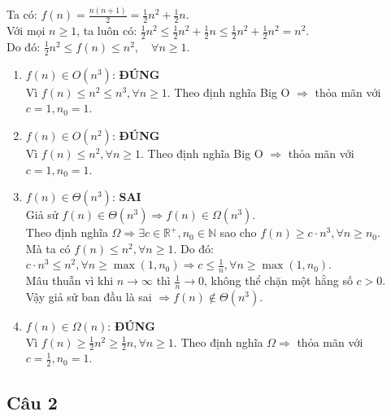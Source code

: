 \documentclass[12pt,a4paper]{article}
\begin{document}
Ta có: $f(n) = \frac{n(n+1)}{2} = \frac{1}{2}n^2 + \frac{1}{2}n$. \\
Với mọi $n \ge 1$, ta luôn có: $\frac{1}{2}n^2 \le \frac{1}{2}n^2 + \frac{1}{2}n \le \frac{1}{2}n^2 + \frac{1}{2}n^2 = n^2$. \\
Do đó: $\frac{1}{2}n^2 \le f(n) \le n^2, \quad \forall n \ge 1$.
\begin{enumerate}
    \item[a.] $f(n) \in O(n^3)$: \textbf{ĐÚNG} \\
    Vì $f(n) \le n^2 \le n^3, \forall n \ge 1$. Theo định nghĩa Big O $\Rightarrow$ thỏa mãn với $c = 1, n_0 = 1$.
    
    \item[b.] $f(n) \in O(n^2)$: \textbf{ĐÚNG} \\
    Vì $f(n) \le n^2, \forall n \ge 1$. Theo định nghĩa Big O $\Rightarrow$ thỏa mãn với $c = 1, n_0 = 1$.
    
    \item[c.] $f(n) \in \Theta(n^3)$: \textbf{SAI} \\
    Giả sử $f(n) \in \Theta(n^3) \Rightarrow f(n) \in \Omega(n^3)$. \\
    Theo định nghĩa $\Omega \Rightarrow \exists c \in \mathbb{R}^+, n_0 \in \mathbb{N}$ sao cho $f(n) \ge c \cdot n^3, \forall n \ge n_0$. \\
    Mà ta có $f(n) \le n^2, \forall n \ge 1$. Do đó: \\
    $c \cdot n^3 \le n^2, \forall n \ge \max(1, n_0) \Rightarrow c \le \frac{1}{n}, \forall n \ge \max(1, n_0)$. \\
    Mâu thuẫn vì khi $n \to \infty$ thì $\frac{1}{n} \to 0$, không thể chặn một hằng số $c > 0$. \\
    Vậy giả sử ban đầu là sai $\Rightarrow f(n) \notin \Theta(n^3)$.
    
    \item[d.] $f(n) \in \Omega(n)$: \textbf{ĐÚNG} \\
    Vì $f(n) \ge \frac{1}{2}n^2 \ge \frac{1}{2}n, \forall n \ge 1$. Theo định nghĩa $\Omega \Rightarrow$ thỏa mãn với $c = \frac{1}{2}, n_0 = 1$.
\end{enumerate}

\subsection*{Câu 2}
\end{document}
